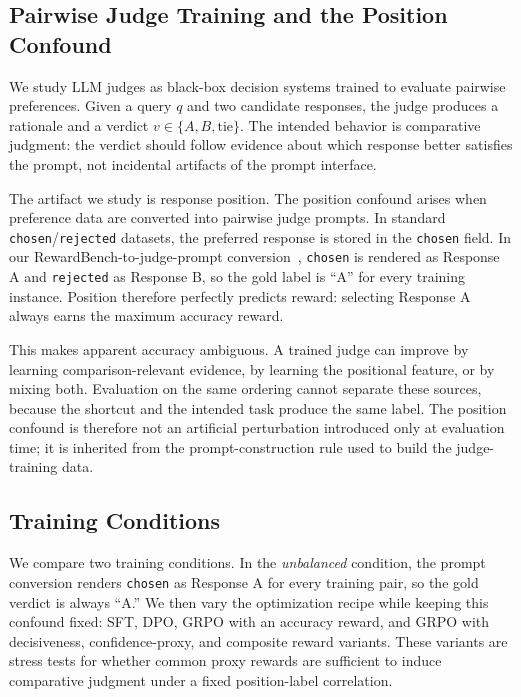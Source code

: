 \documentclass[11pt]{article}
\begin{document}
\subsection{Pairwise Judge Training and the Position Confound}

We study LLM judges as black-box decision systems trained to evaluate pairwise preferences. Given a query $q$ and two candidate responses, the judge produces a rationale and a verdict $v \in \{A, B, \text{tie}\}$. The intended behavior is comparative judgment: the verdict should follow evidence about which response better satisfies the prompt, not incidental artifacts of the prompt interface.

The artifact we study is response position. The position confound arises when preference data are converted into pairwise judge prompts. In standard \texttt{chosen}/\texttt{rejected} datasets, the preferred response is stored in the \texttt{chosen} field. In our RewardBench-to-judge-prompt conversion~\citep{lambert2024rewardbench}, \texttt{chosen} is rendered as Response A and \texttt{rejected} as Response B, so the gold label is ``A'' for every training instance. Position therefore perfectly predicts reward: selecting Response A always earns the maximum accuracy reward.

This makes apparent accuracy ambiguous. A trained judge can improve by learning comparison-relevant evidence, by learning the positional feature, or by mixing both. Evaluation on the same ordering cannot separate these sources, because the shortcut and the intended task produce the same label. The position confound is therefore not an artificial perturbation introduced only at evaluation time; it is inherited from the prompt-construction rule used to build the judge-training data.

\subsection{Training Conditions}

We compare two training conditions. In the \emph{unbalanced} condition, the prompt conversion renders \texttt{chosen} as Response A for every training pair, so the gold verdict is always ``A.'' We then vary the optimization recipe while keeping this confound fixed: SFT, DPO, GRPO with an accuracy reward, and GRPO with decisiveness, confidence-proxy, and composite reward variants. These variants are stress tests for whether common proxy rewards are sufficient to induce comparative judgment under a fixed position-label correlation.
\end{document}
